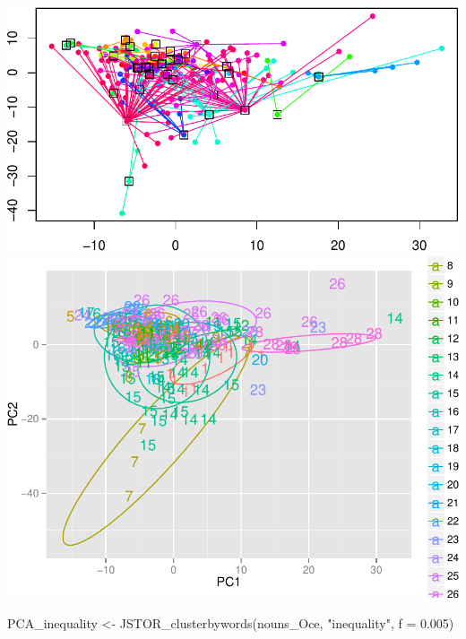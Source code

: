 \documentclass[10pt]{article}
\newenvironment{CodeChunk}{}{}
\begin{document}
\begin{CodeChunk}
\begin{CodeChunk}
\includegraphics{509Assignment_files/figure-latex/onegram3-20} 
\includegraphics{509Assignment_files/figure-latex/onegram3-21} \begin{CodeInput}
PCA_inequality <- JSTOR_clusterbywords(nouns_Oce, "inequality", f = 0.005)
\end{CodeInput}


\end{CodeChunk}
\end{CodeChunk}
\end{document}
